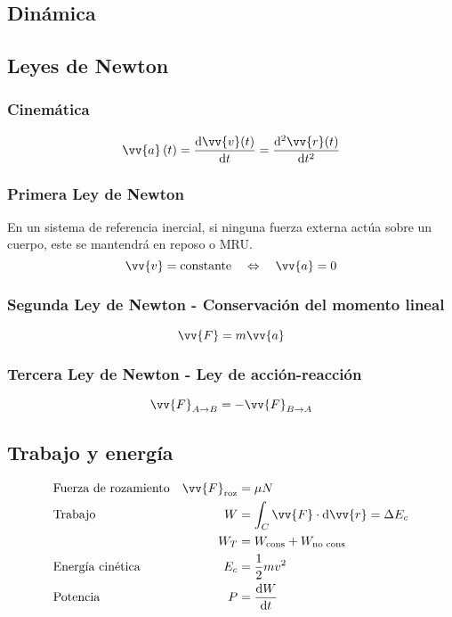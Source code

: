\documentclass[a4paper, 8pt]{extarticle}
\renewcommand{\vec}[1]{\vv{{#1}}}
\begin{document}
\begin{multicols}{3}
  \section{Dinámica}
  \subsection{Leyes de Newton}
  \subsubsection{Cinemática}
  \[ \vec{a}\left( t \right) = \dv{\vec{v}(t)}{t} = \dv[2]{\vec{r}(t)}{t} \]
  \subsubsection{Primera Ley de Newton}
  En un sistema de referencia inercial, si ninguna fuerza externa actúa sobre un cuerpo, este se mantendrá en reposo o MRU.
  \[ \vec{v} = \text{constante} \quad \Leftrightarrow \quad \vec{a} = 0\]
  \subsubsection{Segunda Ley de Newton - Conservación del momento lineal}
  \[ \vec{F} = m \vec{a} \]
  \subsubsection{Tercera Ley de Newton - Ley de acción-reacción}
  \[ \vec{F}_{A\to B} = - \vec{F}_{B\to A} \]

  \subsection{Trabajo y energía}
  \begin{align*}
     & \text{Fuerza de rozamiento} & \vec{F}_{\text{roz}} & = \mu N                                        \\
     & \text{Trabajo}              & W                    & = \int_C \vec{F} \cdot \dd\vec{r} = \Delta E_c \\
     &                             & W_T                  & = W_{\text{cons}} + W_{\text{no cons}}         \\
     & \text{Energía cinética}     & E_c                  & = \frac{1}{2}mv^2                              \\
     & \text{Potencia}             & P                    & = \dv{W}{t}
  \end{align*}


\end{multicols}
\end{document}
